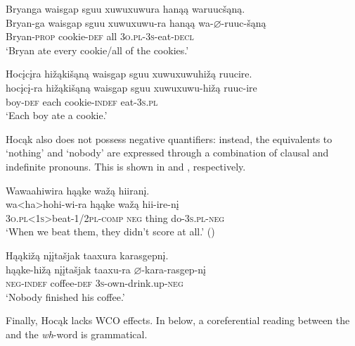 \documentclass[output=paper]{LSP/langsci}
\begin{document}
\begin{exe}
\ex\label{ex:jrs:19}	
\begin{xlist}	
\ex
\glll Bryanga {waisgap sguu xuwuxuwura} 	hanąą 	waruuc\v{s}ąną.\\
Bryan-ga 	{waisgap sguu xuwuxuwu-ra} 	hanąą 	wa-$\varnothing$-ruuc-\v{s}ąną \\
	Bryan-\textsc{prop} 	cookie-\textsc{def}	all 		\textsc{3o.pl-3s}-eat-\textsc{decl} \\
\trans `Bryan ate every cookie/all of the cookies.'

\ex 
\glll Hoc\k{i}c\k{i}ra 	hi\v{z}ąki\v{s}ąną 	{waisgap sguu xuwuxuwuhi\v{z}ą }		ruucire.\\
hoc\k{i}c\k{i}-ra 	hi\v{z}ąki\v{s}ąną 	{waisgap sguu xuwuxuwu-hi\v{z}ą }		ruuc-ire \\
	boy-\textsc{def} 		each 					cookie-\textsc{indef}		eat-\textsc{3s.pl}\\
\trans `Each boy ate a cookie.'
\end{xlist}
\end{exe}

 
Hocąk also does not possess negative quantifiers: instead, the equivalents to `nothing' and `nobody' are expressed through a combination of clausal  and indefinite pronouns. This is shown in and , respectively.
 
\ea\label{ex:jrs:20}
\ea\label{ex:jrs:20a)}
\glll Wawaahiwira 	hąąke 	wa\v{z}ą 	hiiran\k{i}. \\
wa<ha>hohi-wi-ra 						hąąke 	wa\v{z}ą 	hii-ire-n\k{i} \\
	\textsc{3o.pl<1s>}beat-\textsc{1/2pl}-\textsc{comp} \textsc{neg}		thing 	do-\textsc{3s.pl-neg} \\
\trans `When we beat them, they didn't score at all.' (\citealt{Hartmann2012}) 

\ex \label{ex:jrs:20b}
\glll Hąąki\v{z}ą 	{n\k{i}\k{i}ta\v{s}jak taaxura} 	karasgepn\k{i}. \\
hąąke-hi\v{z}ą  {n\k{i}\k{i}ta\v{s}jak taaxu-ra }	$\varnothing$-kara-rasgep-n\k{i} \\
	\textsc{neg-indef} 	coffee-\textsc{def}	\textsc{3s}-own-drink.up-\textsc{neg} \\
\trans `Nobody finished his coffee.'
\z 
\z 
	
Finally, Hocąk lacks WCO effects. In  below, a coreferential reading between the  and the  \textit{wh}-word is grammatical.
\end{document}
